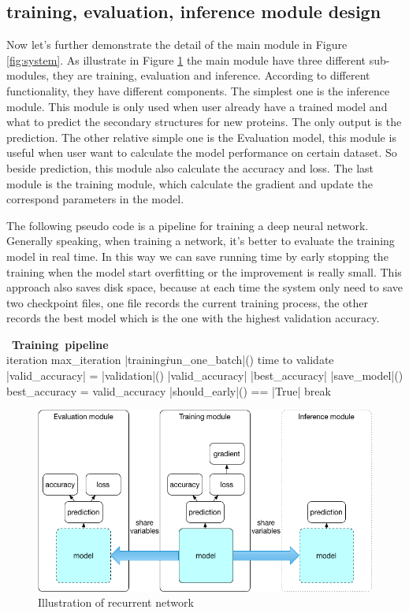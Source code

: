 \subsection{training, evaluation, inference module design}
Now let's further demonstrate the detail of the main module in Figure \ref{fig:system}. As illustrate in Figure \ref{fig:system_detail} the main module have three different sub-modules, they are training, evaluation and inference. According to different functionality, they have different components. The simplest one is the inference module. This module is only used when user already have a trained model and what to predict the secondary structures for new proteins. The only output is the prediction. The other relative simple one is the Evaluation model, this module is useful when user want to calculate the model performance on certain dataset. So beside prediction, this module also calculate the accuracy and loss. The last module is the training module, which calculate the gradient and update the correspond parameters in the model.\par

The following pseudo code is a pipeline for training a deep neural network. Generally speaking, when training a network,  it's better to evaluate the training model in real time. In this way we can save running time by early stopping the training when the model start overfitting or the improvement is really small. This approach also saves disk space, because at each time the system only need to save two checkpoint files, one file records the current training process, the other records the best model which is the one with the highest validation accuracy.

\begin{program}
\mbox{\textbf{ Training pipeline} }
\BEGIN \\ 
\WHILE iteration \lt max\_iteration \DO 
    \CALL |training\.run\_one\_batch|()
    \IF time to validate 
        \CALL |valid_accuracy| = |validation|()
        \IF |valid_accuracy| \gt |best_accuracy|
                  \CALL |save\_model|()
                  best_accuracy = valid_accuracy\FI
    \IF \CALL |should_early|() == |True|
        break
    
\end{program}


\begin{figure}[H] 
	\centering
	\includegraphics[width=5in]{Figures/system_detail}
	\caption[Detail inside recurrent unit]{Illustration of recurrent network}
	\label{fig:system_detail}
\end{figure}